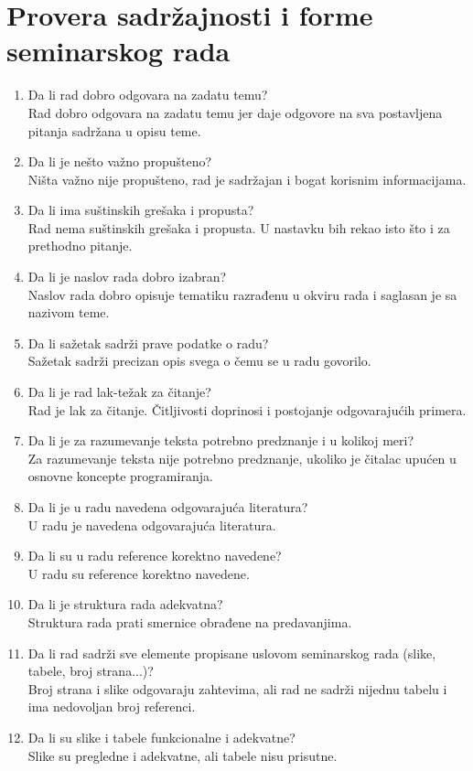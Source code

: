 \documentclass[a4paper]{report}
\begin{document}
\section{Provera sadržajnosti i forme seminarskog rada}

\begin{enumerate}
\item Da li rad dobro odgovara na zadatu temu?\\
Rad dobro odgovara na zadatu temu jer daje odgovore na sva postavljena pitanja sadržana u opisu teme. 
\item Da li je nešto važno propušteno?\\
Ništa važno nije propušteno, rad je sadržajan i bogat korisnim informacijama.
\item Da li ima suštinskih grešaka i propusta?\\
Rad nema suštinskih grešaka i propusta. U nastavku bih rekao isto što i za prethodno pitanje.
\item Da li je naslov rada dobro izabran?\\
Naslov rada dobro opisuje tematiku razrađenu u okviru rada i saglasan je sa nazivom teme.
\item Da li sažetak sadrži prave podatke o radu?\\
Sažetak sadrži precizan opis svega o čemu se u radu govorilo.
\item Da li je rad lak-težak za čitanje?\\
Rad je lak za čitanje. Čitljivosti doprinosi i postojanje odgovarajućih primera.
\item Da li je za razumevanje teksta potrebno predznanje i u kolikoj meri?\\
Za razumevanje teksta nije potrebno predznanje, ukoliko je čitalac upućen u osnovne koncepte programiranja.
\item Da li je u radu navedena odgovarajuća literatura?\\
U radu je navedena odgovarajuća literatura.
\item Da li su u radu reference korektno navedene?\\
U radu su reference korektno navedene.
\item Da li je struktura rada adekvatna?\\
Struktura rada prati smernice obrađene na predavanjima.
\item Da li rad sadrži sve elemente propisane uslovom seminarskog rada (slike, tabele, broj strana...)?\\
Broj strana i slike odgovaraju zahtevima, ali rad ne sadrži nijednu tabelu i ima nedovoljan broj referenci.
\item Da li su slike i tabele funkcionalne i adekvatne?\\
Slike su pregledne i adekvatne, ali tabele nisu prisutne.
\end{enumerate}
\end{document}
